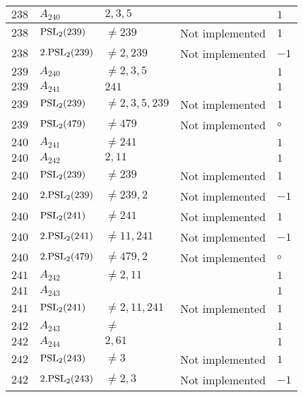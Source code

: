 \documentclass[a4paper, 11pt]{article}
\begin{document}
\begin{longtable}{lllll}
        $ 238 $ & $ A_{240} $ & $ 2, 3, 5 $ & $ ~ $ & $ 1  $ \\ \hline
        $ 238 $ & $ {\rm PSL}_{2}(239) $ & $ \neq 239 $ & Not implemented & $ 1  $ \\ \hline
        $ 238 $ & $ 2.{\rm PSL}_{2}(239) $ & $ \neq 2, 239 $ & Not implemented & $ -1  $ \\ \hline
        $ 239 $ & $ A_{240} $ & $ \neq 2, 3, 5 $ & $ ~ $ & $ 1  $ \\ \hline
        $ 239 $ & $ A_{241} $ & $ 241 $ & $ ~ $ & $ 1  $ \\ \hline
        $ 239 $ & $ {\rm PSL}_{2}(239) $ & $ \neq 2, 3, 5, 239 $ & Not implemented & $ 1  $ \\ \hline
        $ 239 $ & $ {\rm PSL}_{2}(479) $ & $ \neq 479 $ & Not implemented & $\circ$ \\ \hline
        $ 240 $ & $ A_{241} $ & $ \neq 241 $ & $ ~ $ & $ 1  $ \\ \hline
        $ 240 $ & $ A_{242} $ & $ 2, 11 $ & $ ~ $ & $ 1  $ \\ \hline
        $ 240 $ & $ {\rm PSL}_{2}(239) $ & $ \neq 239 $ & Not implemented & $ 1  $ \\ \hline
        $ 240 $ & $ 2.{\rm PSL}_{2}(239) $ & $ \neq 239, 2 $ & Not implemented & $ -1  $ \\ \hline
        $ 240 $ & $ {\rm PSL}_{2}(241) $ & $ \neq 241 $ & Not implemented & $ 1  $ \\ \hline
        $ 240 $ & $ 2.{\rm PSL}_{2}(241) $ & $ \neq 11, 241 $ & Not implemented & $ -1  $ \\ \hline
        $ 240 $ & $ 2.{\rm PSL}_{2}(479) $ & $ \neq 479, 2 $ & Not implemented & $\circ$ \\ \hline
        $ 241 $ & $ A_{242} $ & $ \neq 2, 11 $ & $ ~ $ & $ 1  $ \\ \hline
        $ 241 $ & $ A_{243} $ & $ ~ $ & $ ~ $ & $ 1  $ \\ \hline
        $ 241 $ & $ {\rm PSL}_{2}(241) $ & $ \neq 2, 11, 241 $ & Not implemented & $ 1  $ \\ \hline
        $ 242 $ & $ A_{243} $ & $ \neq  $ & $ ~ $ & $ 1  $ \\ \hline
        $ 242 $ & $ A_{244} $ & $ 2, 61 $ & $ ~ $ & $ 1  $ \\ \hline
        $ 242 $ & $ {\rm PSL}_{2}(243) $ & $ \neq 3 $ & Not implemented & $ 1  $ \\ \hline
        $ 242 $ & $ 2.{\rm PSL}_{2}(243) $ & $ \neq 2, 3 $ & Not implemented & $ -1  $ \\ \hline

\end{longtable}
\end{document}
